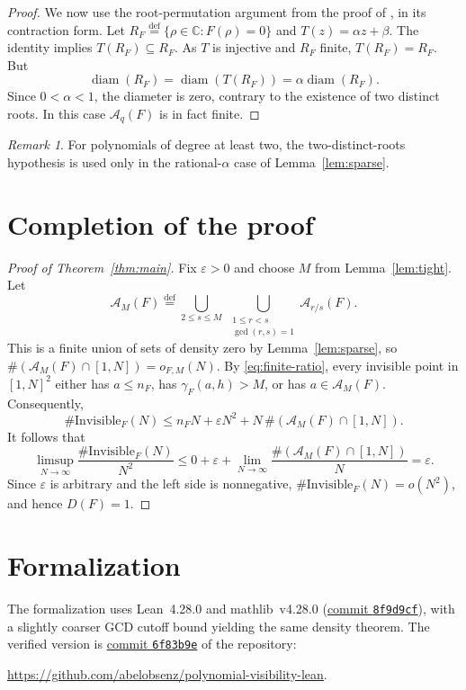 \documentclass[10pt]{amsart}
\theoremstyle{remark}
\newtheorem{remark}[theorem]{Remark}
\newcommand{\C}{\mathbb{C}}
\newcommand{\defeq}{\stackrel{\mathrm{def}}{=}}
\newcommand{\Invisible}{\mathrm{Invisible}}
\begin{document}
\begin{proof}
We now use the root-permutation argument from the proof of
\cite[Proposition~3.3]{LP}, in its contraction form.
Let $R_F\defeq\{\rho\in\C:F(\rho)=0\}$ and $T(z)=\alpha z+\beta$.
The identity implies $T(R_F)\subseteq R_F$.
As $T$ is injective and $R_F$ finite, $T(R_F)=R_F$. But
\[
          \operatorname{diam}(R_F)=\operatorname{diam}(T(R_F))
                              =\alpha\operatorname{diam}(R_F).
\]
Since $0<\alpha<1$, the diameter is zero, contrary to the existence of
two distinct roots. In this case $\mathcal A_q(F)$ is in fact finite.
\end{proof}

\begin{remark}
For polynomials of degree at least two, the two-distinct-roots hypothesis
is used only in the rational-$\alpha$ case of Lemma~\ref{lem:sparse}.
\end{remark}

\section{Completion of the proof}
\begin{proof}[Proof of Theorem~\ref{thm:main}]
Fix $\varepsilon>0$ and choose $M$ from Lemma~\ref{lem:tight}.
Let
\[
       \mathcal A_M(F)\defeq
       \bigcup_{2\leq s\leq M}\ \bigcup_{\substack{1\leq r<s\\\gcd(r,s)=1}}
                       \mathcal A_{r/s}(F).
\]
This is a finite union of sets of density zero by Lemma~\ref{lem:sparse},
so $\#(\mathcal A_M(F)\cap[1,N])=o_{F,M}(N)$.
By \eqref{eq:finite-ratio}, every invisible point in $[1,N]^2$ either
has $a\leq n_F$, has $\gamma_F(a,h)>M$, or has $a\in\mathcal A_M(F)$.
Consequently,
\[
 \#\Invisible_F(N)
 \leq n_FN+\varepsilon N^2+N\,\#(\mathcal A_M(F)\cap[1,N]).
\]
It follows that
\[
 \limsup_{N\to\infty}\frac{\#\Invisible_F(N)}{N^2}
 \leq 0+\varepsilon+
       \lim_{N\to\infty}\frac{\#(\mathcal A_M(F)\cap[1,N])}{N}
 =\varepsilon.
\]
Since $\varepsilon$ is arbitrary and the left side is nonnegative,
$\#\Invisible_F(N)=o(N^2)$, and hence $D(F)=1$.
\end{proof}

\section*{Formalization}
The formalization \cite{Lean} uses Lean~4.28.0 and mathlib~v4.28.0
(\href{https://github.com/leanprover-community/mathlib4/tree/8f9d9cff6bd728b17a24e163c9402775d9e6a365}{commit \texttt{8f9d9cf}}),
with a slightly coarser GCD cutoff bound yielding the same density theorem.
The verified version is
\href{https://github.com/abelobsenz/polynomial-visibility-lean/tree/6f83b9e899f2527898601fc3e028e2c016459ae5}{commit \texttt{6f83b9e}}
of the repository:\par
\noindent\url{https://github.com/abelobsenz/polynomial-visibility-lean}.
\end{document}
